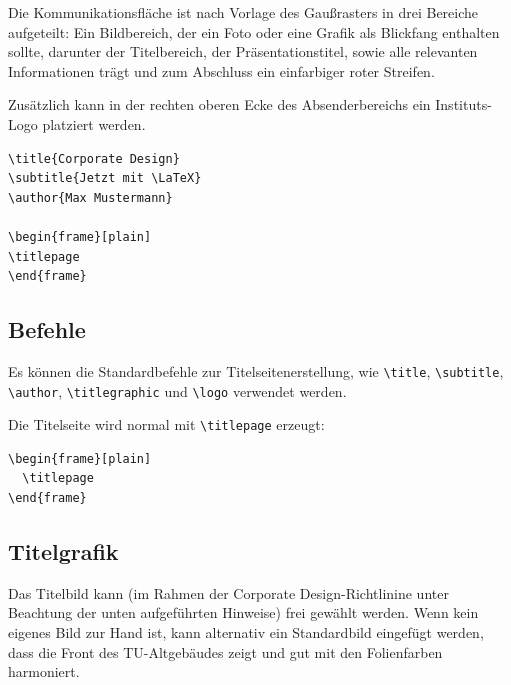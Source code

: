 \documentclass[cmyk,a4paper,colorscheme=green,TUBStitlepage=picture]{tubsreprt}
\begin{document}
Die Kommunikationsfläche ist nach Vorlage des Gaußrasters %
in drei Bereiche aufgeteilt:
Ein Bildbereich, der ein Foto oder eine Grafik als Blickfang enthalten
sollte,
darunter der Titelbereich, der Präsentationstitel, sowie alle relevanten
Informationen trägt
und zum Abschluss ein einfarbiger roter Streifen.

Zusätzlich kann in der rechten oberen Ecke des Absenderbereichs ein
Instituts-Logo platziert werden.

\begin{minipage}{0.5\textwidth}
\begin{verbatim}
\title{Corporate Design}
\subtitle{Jetzt mit \LaTeX}
\author{Max Mustermann}

\begin{frame}[plain]
\titlepage
\end{frame}
\end{verbatim}
\end{minipage}
\begin{minipage}{0.5\textwidth}
\end{minipage}

\subsection{Befehle}

Es können die Standardbefehle zur Titelseitenerstellung, wie
\lstinline{\title},
\lstinline{\subtitle},
\lstinline{\author},
\lstinline{\titlegraphic}
und \lstinline{\logo} verwendet werden.

Die Titelseite wird normal mit \lstinline{\titlepage} erzeugt:

\begin{lstlisting}
\begin{frame}[plain]
  \titlepage
\end{frame}
\end{lstlisting}


\subsection{Titelgrafik}

Das Titelbild kann (im Rahmen der Corporate Design-Richtlinine
unter Beachtung der unten aufgeführten Hinweise) frei gewählt werden.
Wenn kein eigenes Bild zur Hand ist, kann alternativ ein Standardbild eingefügt
werden, dass die Front des TU-Altgebäudes zeigt und gut mit den Folienfarben
harmoniert.
\end{document}
